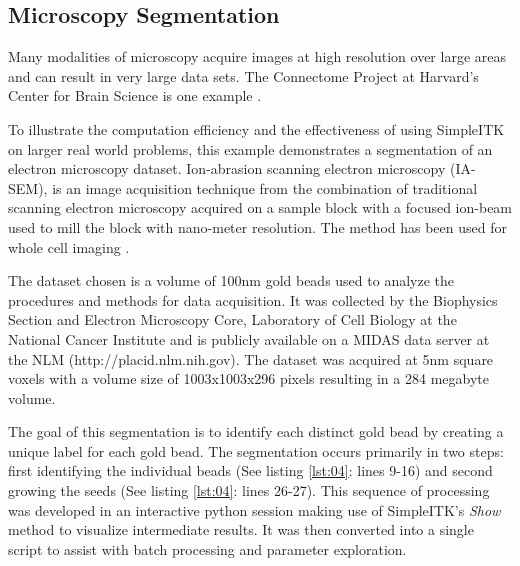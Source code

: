 \documentclass{frontiersMED} %
\begin{document}



\subsection{Microscopy Segmentation}
Many modalities of microscopy acquire images at high resolution over
large areas and can result in very large data sets. The Connectome Project at
Harvard's Center for Brain Science is one example \cite{Seyedhosseini2011}.

To illustrate the computation efficiency and the effectiveness of
using SimpleITK on larger real world problems, this example
demonstrates a segmentation of an electron microscopy
dataset. Ion-abrasion scanning electron microscopy (IA-SEM), is an
image acquisition technique from the combination of traditional
scanning electron microscopy acquired on a sample block with a focused
ion-beam used to mill the block with nano-meter resolution. The method
has been used for whole cell imaging \cite{Murphy2011}.

The dataset chosen is a volume of 100nm gold beads used to analyze the
procedures and methods for data acquisition. It was collected by the
Biophysics Section and Electron Microscopy Core, Laboratory of Cell
Biology at the National Cancer Institute and is publicly available on
a MIDAS data server at the NLM
(http://placid.nlm.nih.gov). The dataset was acquired at 5nm square
voxels with a volume size of 1003x1003x296 pixels resulting in a 284
megabyte volume.

The goal of this segmentation is to identify each distinct gold bead
by creating a unique label for each gold bead. The segmentation occurs
primarily in two steps: first identifying the individual beads (See
listing \ref{lst:04}: lines 9-16) and second growing the seeds (See
listing \ref{lst:04}: lines 26-27). This sequence of
processing was developed in an interactive python session making use
of SimpleITK's \textit{Show} method to visualize intermediate results. It was
then converted into a single script to assist with batch processing
and parameter exploration.


\end{document}
